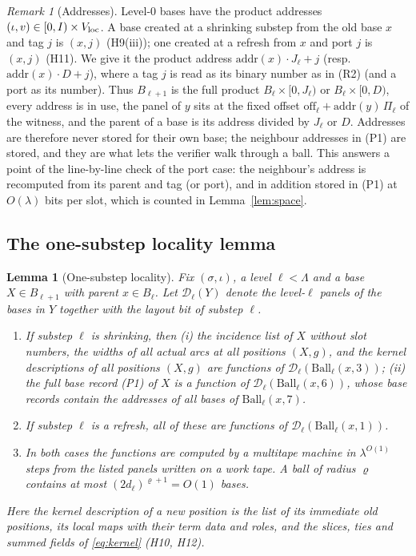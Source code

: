 \documentclass[11pt]{article}
\newtheorem{lemma}[theorem]{Lemma}
\theoremstyle{definition}
\theoremstyle{remark}
\newtheorem{remark}[theorem]{Remark}
\newcommand{\Ball}{\mathrm{Ball}}
\begin{document}
\begin{remark}[Addresses]
Level-$0$ bases have the product addresses $(\iota,v)\in[0,I)\times V_{\rm loc}$. A base created at a shrinking substep from the
old base $x$ and tag $j$ is $(x,j)$ (H9(iii)); one created at a refresh from $x$ and port $j$ is $(x,j)$ (H11). We give it the
product address $\mathrm{addr}(x)\cdot J_\ell+j$ (resp.\ $\mathrm{addr}(x)\cdot D+j$), where a tag $j$ is read as its binary
number as in (R2) (and a port as its number). Thus $B_{\ell+1}$ is the full product
$B_\ell\times[0,J_\ell)$ or $B_\ell\times[0,D)$, every address is in use, the panel of $y$ sits at the fixed offset
$\mathrm{off}_\ell+\mathrm{addr}(y)\,\Pi_\ell$ of the witness, and the parent of a base is its address divided by $J_\ell$ or $D$.
Addresses are therefore never stored for their own base; the neighbour addresses in (P1) are stored, and they are what lets the
verifier walk through a ball. This answers a point of the line-by-line check of the port case: the neighbour's address is recomputed from its
parent and tag (or port), and in addition stored in (P1) at $O(\lambda)$ bits per slot, which is counted in
Lemma~\ref{lem:space}.
\end{remark}

\subsection{The one-substep locality lemma}\label{subsec:locality}

\begin{lemma}[One-substep locality]\label{lem:locality}
Fix $(\sigma,\iota)$, a level $\ell<\Lambda$ and a base $X\in B_{\ell+1}$ with parent $x\in B_\ell$. Let
$\mathcal D_\ell(Y)$ denote the level-$\ell$ panels of the bases in $Y$ together with the layout bit of substep $\ell$.
\begin{enumerate}
\item[(a)] If substep $\ell$ is shrinking, then (i) the incidence list of $X$ without slot numbers, the widths of all actual arcs
  at all positions $(X,g)$, and the kernel descriptions of all positions $(X,g)$ are functions of $\mathcal D_\ell(\Ball_\ell(x,3))$;
  (ii) the full base record (P1) of $X$ is a function of $\mathcal D_\ell(\Ball_\ell(x,6))$, whose base records contain the
  addresses of all bases of $\Ball_\ell(x,7)$.
\item[(b)] If substep $\ell$ is a refresh, all of these are functions of $\mathcal D_\ell(\Ball_\ell(x,1))$.
\item[(c)] In both cases the functions are computed by a multitape machine in $\lambda^{O(1)}$ steps from the listed panels written
  on a work tape. A ball of radius $\varrho$ contains at most $(2d_\ell)^{\varrho+1}=O(1)$ bases.
\end{enumerate}
Here the \emph{kernel description} of a new position is the list of its immediate old positions, its local maps with their term
data and roles, and the slices, ties and summed fields of \eqref{eq:kernel} (H10, H12).
\end{lemma}
\end{document}
